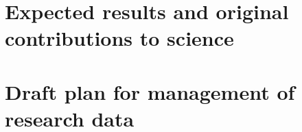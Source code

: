 \documentclass{article}
\theoremstyle{mytheoremstyle}
\theoremstyle{mytheoremstyle}
\theoremstyle{myproblemstyle}
\begin{document}
\section{Expected results and original contributions to science}
\section{Draft plan for management of research data}
\end{document}
